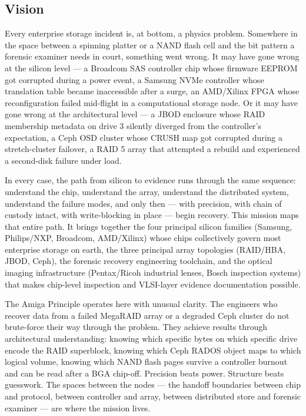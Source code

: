 \documentclass[11pt,letterpaper]{article}
\begin{document}
\subsection{Vision}

Every enterprise storage incident is, at bottom, a physics problem. Somewhere in the space between a spinning platter or a NAND flash cell and the bit pattern a forensic examiner needs in court, something went wrong. It may have gone wrong at the silicon level --- a Broadcom SAS controller chip whose firmware EEPROM got corrupted during a power event, a Samsung NVMe controller whose translation table became inaccessible after a surge, an AMD/Xilinx FPGA whose reconfiguration failed mid-flight in a computational storage node. Or it may have gone wrong at the architectural level --- a JBOD enclosure whose RAID membership metadata on drive 3 silently diverged from the controller's expectation, a Ceph OSD cluster whose CRUSH map got corrupted during a stretch-cluster failover, a RAID 5 array that attempted a rebuild and experienced a second-disk failure under load.

In every case, the path from silicon to evidence runs through the same sequence: understand the chip, understand the array, understand the distributed system, understand the failure modes, and only then --- with precision, with chain of custody intact, with write-blocking in place --- begin recovery. This mission maps that entire path. It brings together the four principal silicon families (Samsung, Philips/NXP, Broadcom, AMD/Xilinx) whose chips collectively govern most enterprise storage on earth, the three principal array topologies (RAID/HBA, JBOD, Ceph), the forensic recovery engineering toolchain, and the optical imaging infrastructure (Pentax/Ricoh industrial lenses, Bosch inspection systems) that makes chip-level inspection and VLSI-layer evidence documentation possible.

The Amiga Principle operates here with unusual clarity. The engineers who recover data from a failed MegaRAID array or a degraded Ceph cluster do not brute-force their way through the problem. They achieve results through architectural understanding: knowing which specific bytes on which specific drive encode the RAID superblock, knowing which Ceph RADOS object maps to which logical volume, knowing which NAND flash pages survive a controller burnout and can be read after a BGA chip-off. Precision beats power. Structure beats guesswork. The spaces between the nodes --- the handoff boundaries between chip and protocol, between controller and array, between distributed store and forensic examiner --- are where the mission lives.
\end{document}
